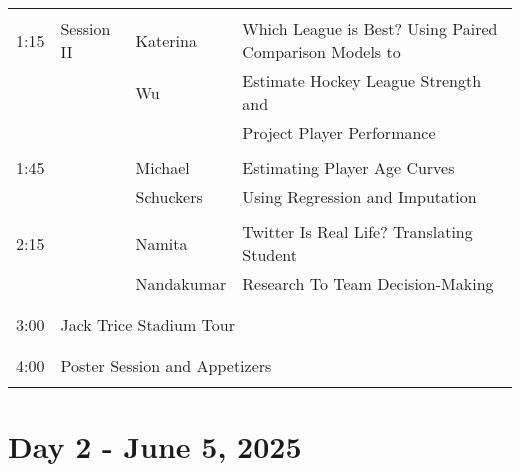 \documentclass[12pt]{article}
\begin{document}
\begin{tabular}{l|l|l|l}
\hline
& & & \\
1:15 & Session II & Katerina 
    & Which League is Best? Using Paired Comparison Models to \\
& & Wu &  Estimate Hockey League Strength and\\
& & &  Project Player Performance \\
& & & \\
1:45 &  & Michael 
& Estimating Player Age Curves \\
& & Schuckers & Using Regression and Imputation \\
& & & \\
2:15 &  & Namita 
& Twitter Is Real Life? Translating Student\\
& & Nandakumar &  Research To Team Decision-Making\\
& & & \\
\hline
& \multicolumn{3}{|l}{}\\
3:00 & \multicolumn{3}{|l}{Jack Trice Stadium Tour} \\
& \multicolumn{3}{|l}{}\\
\hline
& \multicolumn{3}{|l}{}\\
4:00 & \multicolumn{3}{|l}{Poster Session and Appetizers} \\
& \multicolumn{3}{|l}{}\\
\hline
\end{tabular}



\newpage

\section*{Day 2 - June 5, 2025}

\vspace{0.2in} 
\end{document}
